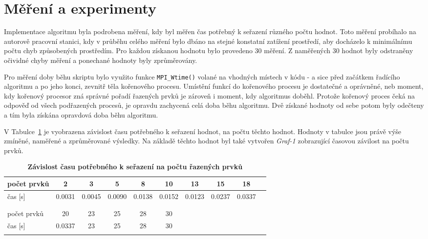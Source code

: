 \documentclass[a4paper,10pt]{article}
\begin{document}
	\section{Měření a experimenty}
		\par Implementace algoritmu byla podrobena měření, kdy byl měřen čas potřebný k seřazení různého počtu hodnot. Toto měření probíhalo na autorově pracovní stanici, kdy v průběhu celého měření bylo dbáno na stejné konstatní zatížení prostředí, aby docházelo k minimálnímu počtu chyb způsobených prostředím. Pro každou získanou hodnotu bylo provedeno 30 měření. Z naměřených 30 hodnot byly odstraněny očividné chyby měření a ponechané hodnoty byly zprůměrovány. 

		\par Pro měření doby běhu skriptu bylo využito funkce \texttt{MPI\_Wtime()} volané na vhodných místech v kódu \-- a sice před začátkem řadícího algoritmu a po jeho konci, zevnitř těla kořenového procesu. Umístění funkcí do kořenového procesu je dostatečné a oprávněné, neb moment, kdy kořenový procesor zná správné pořadí řazených prvků je zároveň i moment, kdy algoritmus doběhl. Protože kořenový proces čeká na odpověď od všech podřazených procesů, je opravdu zachycená celá doba běhu algoritmu. Dvě získané hodnoty od sebe potom byly odečteny a tím byla získána opravdová doba běhu algoritmu. 
    	
    	\par V Tabulce~\ref{tab:1} je vyobrazena závislost času potřebného k seřazení hodnot, na počtu těchto hodnot. Hodnoty v tabulce jsou právě výše zmíněné, naměřené a zprůměrované výsledky. Na základě těchto hodnot byl také vytvořen \textit{Graf-1} zobrazující časovou závilost na počtu prvků.


	\begin{table}[th]
		\centering
		\caption{\textbf{Závislost času potřebného k seřazení na počtu řazených prvků}}
		\label{my-label}
		\begin{tabular}{l||ccccccccc}
		 \hline \hline
		 počet prvků & 2 & 3 & 5 & 8 & 10 & 13 & 15 & 18 \\
		 \hline
		 čas [s]     & 0.0031 & 0.0045 & 0.0090 & 0.0138 & 0.0152 & 0.0123 & 0.0237 & 0.0337  \\
		   &    &    &    &    &   \\
		   &    &    &    &    &   \\
		 \hline
		 počet prvků  & 20 & 23 & 25 & 28 & 30 \\
		 \hline
		 čas [s]  & 0.0337 & 23 & 25 & 28 & 30 \\
		  \hline
		 \label{tab:1}
		\end{tabular}
	\end{table}
\end{document}
